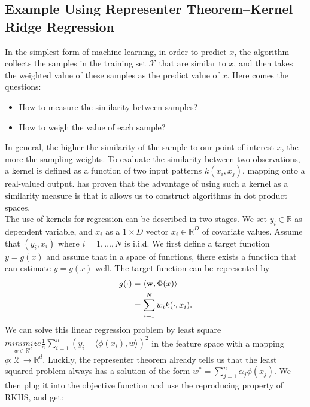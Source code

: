 \subsection{Example Using Representer Theorem--Kernel Ridge Regression}
In the simplest form of machine learning, in order to predict $x$, the algorithm collects the samples in the training set $\mathcal{X}$ that are similar to $x$, 
and then takes the weighted value of these samples as the predict value of $x$. Here comes the questions:
\begin{itemize}
    \item How to measure the similarity between samples?
    \item How to weigh the value of each sample?
\end{itemize} 
In general, the higher the similarity of the sample to our point of interest $x$, the more the sampling weights. To evaluate the similarity between two observations, 
a kernel is defined as a function of two input patterns $k(x_i, x_j)$, mapping onto a real-valued output. \citet{hofmann2008kernel} has proven that the advantage of using such a kernel as a similarity measure is that it allows us to construct algorithms in dot product spaces.\\
The use of kernels for regression can be described in two stages. We set $y_i \in \mathbb{R}$ as dependent variable, 
and $x_i$ as a $1 \times D$ vector $x_i \in \mathbb{R}^D$ of covariate values. Assume that $(y_i, x_i)$ where $i = 1, \dots, N$ is i.i.d. We first define a target function $y=g(x)$ and assume that in a space of functions, there exists 
a function that can estimate $y=g(x)$ well. The target function can be represented by
\begin{align}
    g(\cdot)&= \langle\textbf{w},\Phi(x)\rangle\notag\\
        &=\sum_{i=1}^N w_i k(\cdot,x_i).
\end{align}
We can solve this linear regression problem by least square $\underset{w\in\mathbb{R}^d}{minimize}\frac{1}{n}\sum_{i=1}^n(y_i-\langle\phi(x_i),w\rangle)^2$ in the feature space with a mapping $\phi: \mathcal{X}\rightarrow\mathbb{R}^d$. Luckily, the 
representer theorem already tells us that the least squared problem always has a solution of the form $w^{*}=\sum_{j=1}^n\alpha_j\phi(x_j)$. We then plug it into the objective function and use the reproducing property of RKHS, and get:
